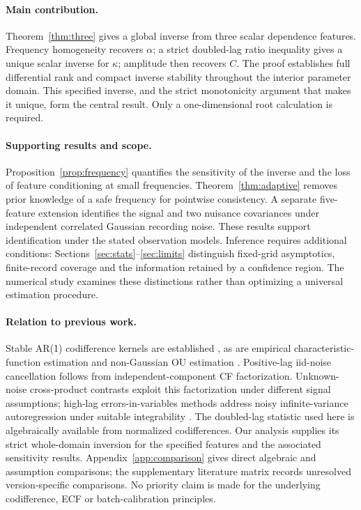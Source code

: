 \documentclass[11pt,a4paper]{article}
\theoremstyle{remark}\newtheorem{remark}[theorem]{Remark}
\begin{document}
\paragraph{Main contribution.}
Theorem~\ref{thm:three} gives a global inverse from three scalar dependence features. Frequency homogeneity recovers $\alpha$; a strict doubled-lag ratio inequality gives a unique scalar inverse for $\kappa$; amplitude then recovers $C$. The proof establishes full differential rank and compact inverse stability throughout the interior parameter domain. This specified inverse, and the strict monotonicity argument that makes it unique, form the central result. Only a one-dimensional root calculation is required.

\paragraph{Supporting results and scope.}
Proposition~\ref{prop:frequency} quantifies the sensitivity of the inverse and the loss of feature conditioning at small frequencies. Theorem~\ref{thm:adaptive} removes prior knowledge of a safe frequency for pointwise consistency. A separate five-feature extension identifies the signal and two nuisance covariances under independent correlated Gaussian recording noise. These results support identification under the stated observation models. Inference requires additional conditions: Sections~\ref{sec:stats}--\ref{sec:limits} distinguish fixed-grid asymptotics, finite-record coverage and the information retained by a confidence region. The numerical study examines these distinctions rather than optimizing a universal estimation procedure.

\paragraph{Relation to previous work.}
Stable AR(1) codifference kernels are established \cite{nw,rd,rosadi}, as are empirical characteristic-function estimation and non-Gaussian OU estimation \cite{ky,tl,chl}. Positive-lag iid-noise cancellation follows from independent-component CF factorization. Unknown-noise cross-product contrasts \cite{gl,gl22} exploit this factorization under different signal assumptions; high-lag errors-in-variables methods address noisy infinite-variance autoregression under suitable integrability \cite{zw}. The doubled-lag statistic used here is algebraically available from normalized codifferences. Our analysis supplies its strict whole-domain inversion for the specified features and the associated sensitivity results. Appendix~\ref{app:comparison} gives direct algebraic and assumption comparisons; the supplementary literature matrix records unresolved version-specific comparisons. No priority claim is made for the underlying codifference, ECF or batch-calibration principles.
\end{document}
